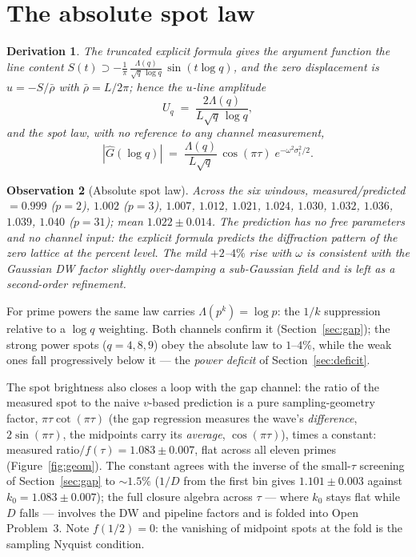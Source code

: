 \documentclass[12pt]{amsart}
\newtheorem{observation}{Observation}
\newtheorem{derivation}[observation]{Derivation}
\begin{document}
\section{The absolute spot law}\label{sec:abs}

\begin{derivation}
The truncated explicit formula gives the argument function the line
content $S(t) \supset -\tfrac{1}{\pi}\,
\frac{\Lambda(q)}{\sqrt{q}\,\log q}\,\sin(t\log q)$, and the zero
displacement is $u = -S/\bar\rho$ with $\bar\rho = L/2\pi$; hence the
$u$-line amplitude
\[
U_q \;=\; \frac{2\Lambda(q)}{L\sqrt{q}\,\log q},
\]
and the spot law, with no reference to any channel measurement,
\[
|\hat G(\log q)| \;=\; \frac{\Lambda(q)}{L\sqrt{q}}\,
\cos(\pi\tau)\; e^{-\omega^2\sigma_t^2/2}.
\]
\end{derivation}

\begin{observation}[Absolute spot law]
Across the six windows, measured/predicted $= 0.999$ ($p=2$), $1.002$
($p=3$), $1.007$, $1.012$, $1.021$, $1.024$, $1.030$, $1.032$, $1.036$,
$1.039$, $1.040$ ($p=31$); mean $1.022 \pm 0.014$. The prediction has
\emph{no} free parameters and \emph{no} channel input: the explicit
formula predicts the diffraction pattern of the zero lattice at the
percent level. The mild $+2$--$4\%$ rise with $\omega$ is consistent
with the Gaussian DW factor slightly over-damping a sub-Gaussian field
and is left as a second-order refinement.
\end{observation}

For prime powers the same law carries $\Lambda(p^k) = \log p$: the
$1/k$ suppression relative to a $\log q$ weighting. Both channels
confirm it (Section~\ref{sec:gap}); the strong power spots ($q = 4, 8,
9$) obey the absolute law to $1$--$4\%$, while the weak ones fall
progressively below it --- the \emph{power deficit} of
Section~\ref{sec:deficit}.

The spot brightness also closes a loop with the gap channel: the ratio
of the measured spot to the naive $v$-based prediction is a pure
sampling-geometry factor, $\pi\tau\cot(\pi\tau)$ (the gap regression
measures the wave's \emph{difference}, $2\sin(\pi\tau)$, the midpoints
carry its \emph{average}, $\cos(\pi\tau)$), times a constant: measured
ratio$/f(\tau) = 1.083 \pm 0.007$, flat across all eleven primes
(Figure~\ref{fig:geom}). The constant agrees with the inverse of the small-$\tau$ screening of
Section~\ref{sec:gap} to $\sim 1.5\%$ ($1/D$ from the first bin gives
$1.101 \pm 0.003$ against $k_0 = 1.083 \pm 0.007$); the full closure
algebra across $\tau$ --- where $k_0$ stays flat while $D$ falls ---
involves the DW and pipeline factors and is folded into Open
Problem~3. Note $f(1/2) = 0$: the vanishing of midpoint
spots at the fold is the sampling Nyquist condition.
\end{document}
